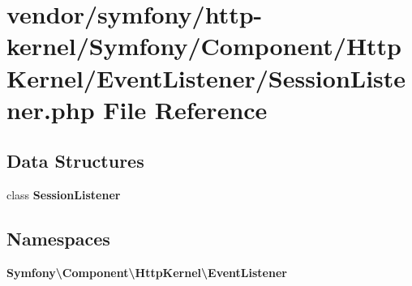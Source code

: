 \section{vendor/symfony/http-\/kernel/\+Symfony/\+Component/\+Http\+Kernel/\+Event\+Listener/\+Session\+Listener.php File Reference}
\label{_session_listener_8php}
\subsection*{Data Structures}
\begin{DoxyCompactItemize}
\item 
class {\bf Session\+Listener}
\end{DoxyCompactItemize}
\subsection*{Namespaces}
\begin{DoxyCompactItemize}
\item 
 {\bf Symfony\textbackslash{}\+Component\textbackslash{}\+Http\+Kernel\textbackslash{}\+Event\+Listener}
\end{DoxyCompactItemize}
